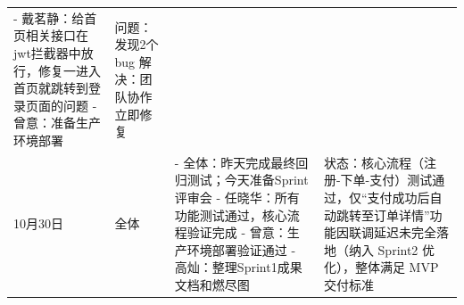 \begin{levellist}
\begin{longtable}{>{\centering\arraybackslash}m{1cm} >{\centering\arraybackslash}m{1cm} >{\centering\arraybackslash}m{8.5cm} >{\centering\arraybackslash}m{3cm}}
        - 戴茗静：给首页相关接口在jwt拦截器中放行，修复一进入首页就跳转到登录页面的问题 \newline
        - 曾意：准备生产环境部署                                       & 问题：发现2个bug \newline
        解决：团队协作立即修复                                                                                                                                                                                                                                      \\
        10月30日                                              & 全体                                                                               & - 全体：昨天完成最终回归测试；今天准备Sprint评审会 \newline
        - 任晓华：所有功能测试通过，核心流程验证完成 \newline
        - 曾意：生产环境部署验证通过 \newline
        - 高灿：整理Sprint1成果文档和燃尽图                              & 状态：核心流程（注册-下单-支付）测试通过，仅“支付成功后自动跳转至订单详情”功能因联调延迟未完全落地（纳入 Sprint2 优化），整体满足 MVP 交付标准                                                                                                           \\
    \end{longtable}


\end{levellist}
